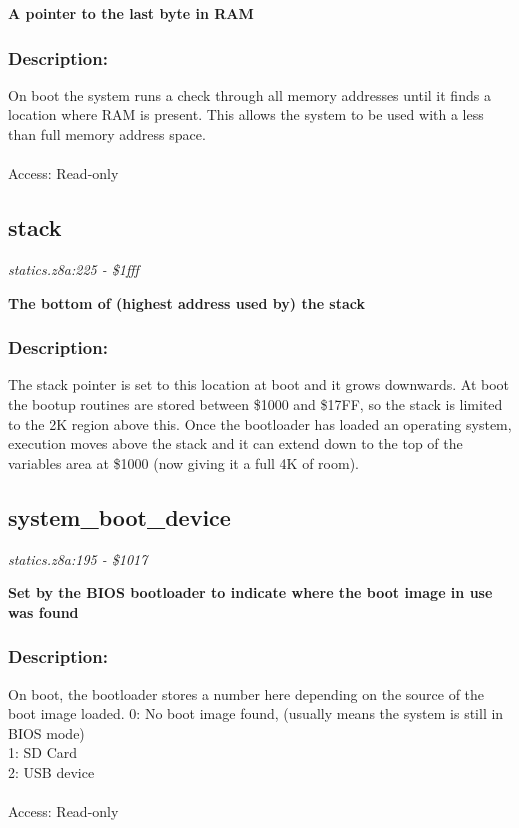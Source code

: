 \noindent
\textbf{A pointer to the last byte in RAM}

\subsubsection{Description:}
 On boot the system runs a check through all memory addresses until it finds a location where RAM is present.  This allows the system to be used with a less than full memory address space.\\\\ Access: Read-only

\subsection{stack}
\textit{statics.z8a:225 - \$1fff}

\noindent
\textbf{The bottom of (highest address used by) the stack}

\subsubsection{Description:}
 The stack pointer is set to this location at boot and it grows downwards.  At boot the bootup routines are stored between \$1000 and \$17FF, so the stack is limited to the 2K region above this.  Once the bootloader has loaded an operating system, execution moves above the stack and it can extend down to the top of the variables area at \$1000 (now giving it a full 4K of room).

\subsection{system\_boot\_device}
\textit{statics.z8a:195 - \$1017}

\noindent
\textbf{Set by the BIOS bootloader to indicate where the boot image in use was found}

\subsubsection{Description:}
 On boot, the bootloader stores a number here depending on the source of the boot image loaded. 0: No boot image found, (usually means the system is still in BIOS mode)\\ 1: SD Card\\ 2: USB device\\\\ Access: Read-only

